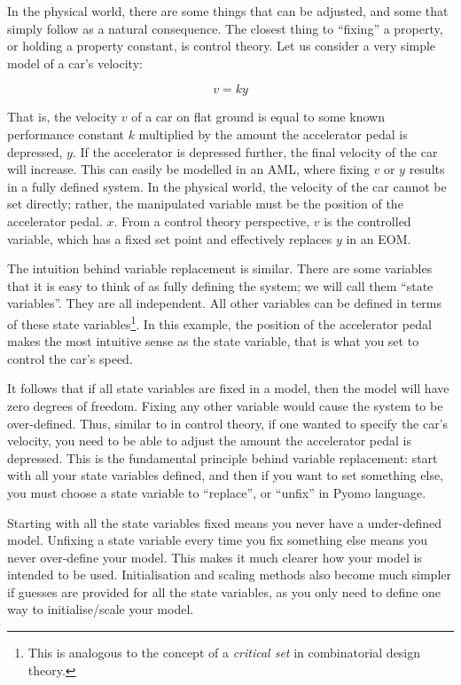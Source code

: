 In the physical world, there are some things that can be adjusted, and
some that simply follow as a natural consequence. The closest thing to
``fixing'' a property, or holding a property constant, is control
theory. Let us consider a very simple model of a car's velocity:

\[
v = ky
\]

That is, the velocity \(v\) of a car on flat ground is equal to some
known performance constant \(k\) multiplied by the amount the
accelerator pedal is depressed, \(y\). If the accelerator is depressed
further, the final velocity of the car will increase. This can easily be
modelled in an AML, where fixing \(v\) or \(y\) results in a fully
defined system. In the physical world, the velocity of the car cannot be
set directly; rather, the manipulated variable must be the position of
the accelerator pedal. \(x\). From a control theory perspective, \(v\)
is the controlled variable, which has a fixed set point and effectively
replaces \(y\) in an EOM.

The intuition behind variable replacement is similar. There are some
variables that it is easy to think of as fully defining the system; we
will call them ``state variables''. They are all independent. All other
variables can be defined in terms of these state variables\footnote{This
  is analogous to the concept of a \emph{critical set} in combinatorial
  design theory.}. In this example, the position of the accelerator
pedal makes the most intuitive sense as the state variable, that is what
you set to control the car's speed.

It follows that if all state variables are fixed in a model, then the
model will have zero degrees of freedom. Fixing any other variable would
cause the system to be over-defined. Thus, similar to in control theory,
if one wanted to specify the car's velocity, you need to be able to
adjust the amount the accelerator pedal is depressed. This is the
fundamental principle behind variable replacement: start with all your
state variables defined, and then if you want to set something else, you
must choose a state variable to ``replace'', or ``unfix'' in Pyomo
language.

Starting with all the state variables fixed means you never have a
under-defined model. Unfixing a state variable every time you fix
something else means you never over-define your model. This makes it
much clearer how your model is intended to be used. Initialisation and
scaling methods also become much simpler if guesses are provided for all
the state variables, as you only need to define one way to
initialise/scale your model.

